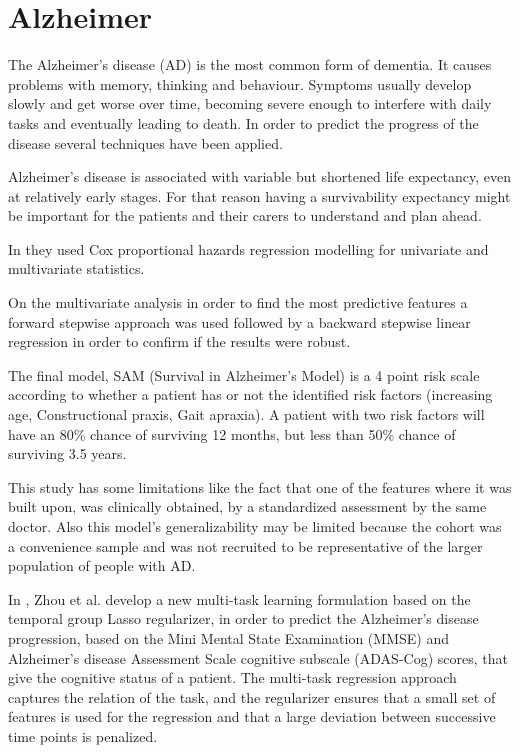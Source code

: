  \section{Alzheimer}
 \label{section:alz}
 
The Alzheimer’s disease (AD) is the most common form of dementia. It causes problems with memory, thinking and behaviour. 
Symptoms usually develop slowly and get worse over time, becoming severe enough to interfere with daily tasks and eventually 
leading to death. In order to predict the progress of the disease several techniques have been applied.

Alzheimer’s disease is associated with variable but shortened life expectancy, even at relatively early stages. For that
 reason having a survivability expectancy might be important for the patients and their carers to understand and plan ahead. 

In \cite{Paradise2009} they used Cox proportional hazards regression modelling for univariate and multivariate statistics. 

On the multivariate analysis in order to find the most predictive features a forward stepwise approach was used followed
 by a backward stepwise linear regression in order to confirm if the results were robust. 

The final model, SAM (Survival in Alzheimer’s Model) is a 4 point risk scale according to whether a patient has or not the
 identified risk factors (increasing age, Constructional praxis, Gait apraxia). A patient with two risk factors will have 
 an 80\% chance of surviving 12 months, but less than 50\% chance of surviving 3.5 years.

This study has some limitations like the fact that one of the features where it was built upon, was clinically obtained, by a
 standardized assessment by the same doctor. Also this model’s generalizability may be limited because the cohort was a convenience
 sample and was not recruited to be representative of the larger population of people with AD.

In \cite{Zhou2011}, Zhou et al. develop a new multi-task learning formulation based on the temporal group Lasso regularizer,
 in order to predict the Alzheimer’s disease progression, based on the Mini Mental State Examination (MMSE) and Alzheimer’s disease 
 Assessment Scale cognitive subscale (ADAS-Cog) scores, that give the cognitive status of a patient. The multi-task regression
 approach captures the relation of the task, and the regularizer ensures that a small set of features is used for the regression
 and that a large deviation between successive time points is penalized.

